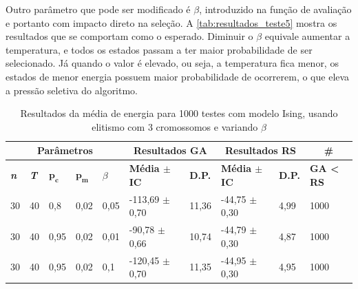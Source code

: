 Outro parâmetro que pode ser modificado é \(\beta\), introduzido na função de avaliação e portanto com impacto direto na seleção. A \autoref{tab:resultados_teste5} mostra os resultados que se comportam como o esperado. Diminuir o \(\beta\) equivale aumentar a temperatura, e todos os estados passam a ter maior probabilidade de ser selecionado. Já quando o valor é elevado, ou seja, a temperatura fica menor, os estados de menor energia possuem maior probabilidade de ocorrerem, o que eleva a pressão seletiva do algoritmo. 

\begin{table}[h!]
	\centering
	\begin{tabular}{|l|l|l|l|l|l|l|l|l|l|}
		\hline
		\multicolumn{5}{|c|}{\textbf{Parâmetros}}                                                    & \multicolumn{2}{c|}{\textbf{Resultados GA}}                                        & \multicolumn{2}{c|}{\textbf{Resultados RS}}                                        & \multicolumn{1}{c|}{\textbf{\#}}                      \\ \hline
		\textbf{\textit{n}} & \textbf{\textit{T}} & $\bm{p_c}$ & $\bm{p_m}$ & $\beta$ & \textbf{Média $\pm$ IC} & \textbf{D.P.} & \textbf{Média $\pm$ IC} & \textbf{D.P.} & \textbf{GA < RS} \\ \hline
		30                          & 40                          & 0,8        & 0,02  & 0,05      & -113,69 $\pm$ 0,70                           & 11,36                          & -44,75 $\pm$ 0,30                            & 4,99                           & 1000                                      \\ \hline
		30                          & 40                          & 0,95        & 0,02 & 0,01      & -90,78 $\pm$ 0,66                            & 10,74                          & -44,79 $\pm$ 0,30                            & 4,87                           & 1000                                      \\ \hline
		30                          & 40                          & 0,95        & 0,02 & 0,1      & -120,45 $\pm$ 0,70                            & 11,35                          & -44,95 $\pm$ 0,30                            & 4,95                           & 1000                                      \\ \hline
	\end{tabular}
	\caption{Resultados da média de energia para 1000 testes com modelo Ising, usando elitismo com 3 cromossomos e variando \(\beta\)}
	\label{tab:resultados_teste5}
\end{table}

